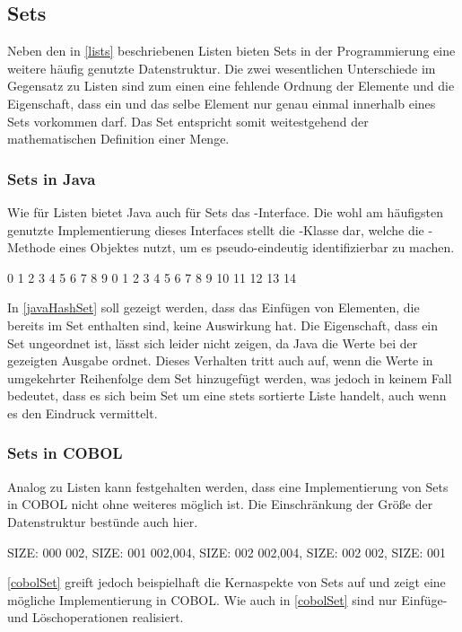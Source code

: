 \subsection{Sets}
Neben den in \autoref{lists} beschriebenen Listen bieten Sets in der Programmierung eine weitere häufig genutzte Datenstruktur. Die zwei wesentlichen Unterschiede im Gegensatz zu Listen sind zum einen eine fehlende Ordnung der Elemente und die Eigenschaft, dass ein und das selbe Element nur genau einmal innerhalb eines Sets vorkommen darf. Das Set entspricht somit weitestgehend der mathematischen Definition einer Menge.

\subsubsection*{Sets in Java}
Wie für Listen bietet Java auch für Sets das -Interface. Die wohl am häufigsten genutzte Implementierung dieses Interfaces stellt die -Klasse dar, welche die -Methode eines Objektes nutzt, um es pseudo-eindeutig identifizierbar zu machen.

\begin{shellwindow}
0 1 2 3 4 5 6 7 8 9 
0 1 2 3 4 5 6 7 8 9 10 11 12 13 14 
\end{shellwindow}
In \autoref{javaHashSet} soll gezeigt werden, dass das Einfügen von Elementen, die bereits im Set enthalten sind, keine Auswirkung hat. Die Eigenschaft, dass ein Set ungeordnet ist, lässt sich leider nicht zeigen, da Java die Werte bei der gezeigten Ausgabe ordnet. Dieses Verhalten tritt auch auf, wenn die Werte in umgekehrter Reihenfolge dem Set hinzugefügt werden, was jedoch in keinem Fall bedeutet, dass es sich beim Set um eine stets sortierte Liste handelt, auch wenn es den Eindruck vermittelt.

\subsubsection*{Sets in COBOL}
Analog zu Listen kann festgehalten werden, dass eine Implementierung von Sets in COBOL nicht ohne weiteres möglich ist. Die Einschränkung der Größe der Datenstruktur bestünde auch hier. 
\begin{shellwindow}
 SIZE: 000
002, SIZE: 001
002,004, SIZE: 002
002,004, SIZE: 002
002, SIZE: 001
\end{shellwindow}
\autoref{cobolSet} greift jedoch beispielhaft die Kernaspekte von Sets auf und zeigt eine mögliche Implementierung in COBOL. Wie auch in \autoref{cobolSet} sind nur Einfüge- und Löschoperationen realisiert.